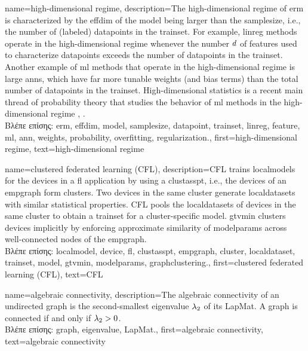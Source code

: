 {name={high-dimensional regime}, 
	description={The 
		high-dimensional regime of \gls{erm} is characterized by the \gls{effdim} of the \gls{model} 
		being larger than the \gls{samplesize}, i.e., the number of (labeled) \gls{datapoint}s in the \gls{trainset}. 
		For example, \gls{linreg} methods operate in the high-dimensional regime whenever the number $d$ of \gls{feature}s 
		used to characterize \gls{datapoint}s exceeds the number of \gls{datapoint}s in the \gls{trainset}. 
		Another example of \gls{ml} methods that operate in the high-dimensional regime is large \gls{ann}s, which have 
		far more tunable \gls{weights} (and bias terms) than the total number of \gls{datapoint}s in the \gls{trainset}. 
		High-dimensional statistics is a recent main thread of \gls{probability} theory that studies the 
		behavior of \gls{ml} methods in the high-dimensional regime \cite{Wain2019}, \cite{BuhlGeerBook}.\\
		\foreignlanguage{greek}{Βλέπε επίσης:} \gls{erm}, \gls{effdim}, \gls{model}, \gls{samplesize}, \gls{datapoint}, \gls{trainset}, 
		\gls{linreg}, \gls{feature}, \gls{ml}, \gls{ann}, \gls{weights}, \gls{probability}, \gls{overfitting}, \gls{regularization}.},
   	first={high-dimensional regime},
   	text={high-dimensional regime}
}
	
{name={clustered federated learning (CFL)}, 
	description={CFL trains \gls{localmodel}s for the 
 		\gls{device}s in a \gls{fl} application by using a \gls{clustasspt}, i.e., the \gls{device}s 
 		of an \gls{empgraph} form \gls{cluster}s. Two \gls{device}s in the same \gls{cluster} generate 
 		\gls{localdataset}s with similar statistical properties. CFL pools the \gls{localdataset}s of \gls{device}s 
 		in the same \gls{cluster} to obtain a \gls{trainset} for a \gls{cluster}-specific \gls{model}. 
 		\Gls{gtvmin} clusters \gls{device}s implicitly by enforcing approximate similarity of \glspl{modelparam} 
 		across well-connected nodes of the \gls{empgraph}.\\
		\foreignlanguage{greek}{Βλέπε επίσης:}  \gls{localmodel}, \gls{device}, \gls{fl}, \gls{clustasspt}, \gls{empgraph}, 
		\gls{cluster}, \gls{localdataset}, \gls{trainset}, \gls{model}, \gls{gtvmin}, \glspl{modelparam}, \gls{graphclustering}.}, 
	first={clustered federated learning (CFL)},
	text={CFL} 
}

{name={algebraic connectivity},
	description={The algebraic connectivity of an undirected \gls{graph} 
		is the second-smallest \gls{eigenvalue} $\lambda_{2}$ of its \gls{LapMat}. A \gls{graph} is connected if and only if 
		$\lambda_{2} >0$.\\
		\foreignlanguage{greek}{Βλέπε επίσης:} \gls{graph}, \gls{eigenvalue}, \gls{LapMat}.},
	first={algebraic connectivity},
	text={algebraic connectivity}
}

